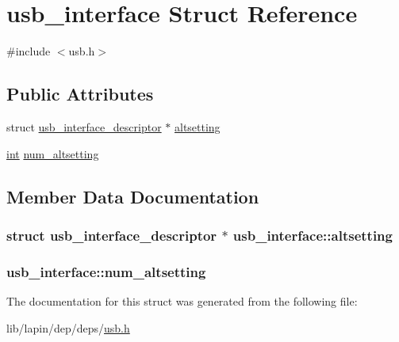 \hypertarget{structusb__interface}{\section{usb\-\_\-interface Struct Reference}
\label{structusb__interface}
}


{\ttfamily \#include $<$usb.\-h$>$}

\subsection*{Public Attributes}
\begin{DoxyCompactItemize}
\item 
struct \hyperlink{structusb__interface__descriptor}{usb\-\_\-interface\-\_\-descriptor} $\ast$ \hyperlink{structusb__interface_a8bef9c6e22eb4cf1467342854c289843}{altsetting}
\item 
\hyperlink{term__entry_8h_ad65b480f8c8270356b45a9890f6499ae}{int} \hyperlink{structusb__interface_aa4f464af60066d059eb5c75b91870a6c}{num\-\_\-altsetting}
\end{DoxyCompactItemize}


\subsection{Member Data Documentation}
\hypertarget{structusb__interface_a8bef9c6e22eb4cf1467342854c289843}{
\subsubsection[{altsetting}]{\setlength{\rightskip}{0pt plus 5cm}struct {\bf usb\-\_\-interface\-\_\-descriptor} $\ast$ usb\-\_\-interface\-::altsetting}}\label{structusb__interface_a8bef9c6e22eb4cf1467342854c289843}
\hypertarget{structusb__interface_aa4f464af60066d059eb5c75b91870a6c}{
\subsubsection[{num\-\_\-altsetting}]{ usb\-\_\-interface\-::num\-\_\-altsetting}}\label{structusb__interface_aa4f464af60066d059eb5c75b91870a6c}


The documentation for this struct was generated from the following file\-:\begin{DoxyCompactItemize}
\item 
lib/lapin/dep/deps/\hyperlink{deps_2usb_8h}{usb.\-h}\end{DoxyCompactItemize}

